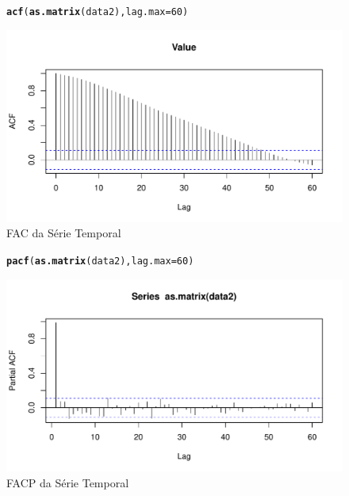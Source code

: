 \documentclass{article}\usepackage[]{graphicx}\usepackage[]{color}
\makeatletter
\def\maxwidth{ %
  \ifdim\Gin@nat@width>\linewidth
    \linewidth
  \else
    \Gin@nat@width
  \fi
}
\newcommand{\hlnum}[1]{\textcolor[rgb]{0.686,0.059,0.569}{#1}}%
\newcommand{\hlstd}[1]{\textcolor[rgb]{0.345,0.345,0.345}{#1}}%
\newcommand{\hlkwc}[1]{\textcolor[rgb]{0.333,0.667,0.333}{#1}}%
\newcommand{\hlkwd}[1]{\textcolor[rgb]{0.737,0.353,0.396}{\textbf{#1}}}%
\newenvironment{kframe}{%
 \def\at@end@of@kframe{}%
 \ifinner\ifhmode%
  \def\at@end@of@kframe{\end{minipage}}%
  \begin{minipage}{\columnwidth}%
 \fi\fi%
 \def\FrameCommand##1{\hskip\@totalleftmargin \hskip-\fboxsep
 \colorbox{shadecolor}{##1}\hskip-\fboxsep
     \hskip-\linewidth \hskip-\@totalleftmargin \hskip\columnwidth}%
 \MakeFramed {\advance\hsize-\width
   \@totalleftmargin\z@ \linewidth\hsize
   \@setminipage}}%
 {\par\unskip\endMakeFramed%
 \at@end@of@kframe}
\newenvironment{knitrout}{}{} %
\makeatother
\begin{document}
            \begin{figure}[H]
            \caption{FAC da Série Temporal}
            \centering
\begin{knitrout}
\color{fgcolor}\begin{kframe}
\begin{alltt}
\hlkwd{acf}\hlstd{(}\hlkwd{as.matrix}\hlstd{(data2),} \hlkwc{lag.max}\hlstd{=}\hlnum{60}\hlstd{)}
\end{alltt}
\end{kframe}
\includegraphics[width=\maxwidth]{figure/unnamed-chunk-66-1} 

\end{knitrout}
            \end{figure}
            
            \begin{figure}[H]
            \caption{FACP da Série Temporal}
            \centering
\begin{knitrout}
\color{fgcolor}\begin{kframe}
\begin{alltt}
\hlkwd{pacf}\hlstd{(}\hlkwd{as.matrix}\hlstd{(data2),} \hlkwc{lag.max}\hlstd{=}\hlnum{60}\hlstd{)}
\end{alltt}
\end{kframe}
\includegraphics[width=\maxwidth]{figure/unnamed-chunk-67-1} 

\end{knitrout}
            \end{figure}
            
\end{document}
